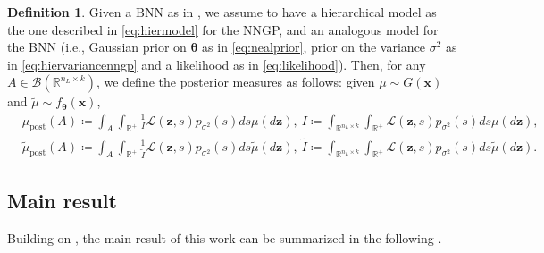 \documentclass[a4paper, 11pt, reqno]{amsart}
\theoremstyle{plain}
\theoremstyle{remark}
\theoremstyle{definition}
\newtheorem{definition}[theorem]{Definition}
\newcommand{\real}{\mathbb{R}}
\newcommand{\borel}[1]{\mathcal{B}\left(#1\right)}
\begin{document}
\begin{definition} \label{def:postnngpbnn}
    Given a BNN as in , we assume to have a hierarchical model as the one described in \cref{eq:hiermodel} for the NNGP, and an analogous model for the BNN (i.e., Gaussian prior on $\bm{\theta}$ as in \cref{eq:nealprior}, prior on the variance $\sigma^2$ as in \cref{eq:hiervariancenngp} and a likelihood as in \cref{eq:likelihood}). Then, for any $A \in \borel{\real^{n_L \times k}}$, we define the posterior measures as follows: given $\mu \sim G(\bm{x})$ and $\widetilde{\mu} \sim f_{\bm{\theta}}(\bm{x})$,
    \begin{equation*}
        \begin{aligned}
            & \mu_{\mathrm{post}}(A) \coloneqq \int_A \int_{\real^+} \frac{1}{\mathit{I}} \mathcal{L}(\bm{z}, s) p_{\sigma^2}(s) ds \mu(d\bm{z}), \ \mathit{I} \coloneqq \int_{\real^{n_L \times k}} \int_{\real^+} \mathcal{L}(\bm{z}, s) p_{\sigma^2}(s) ds \mu(d\bm{z}), \\
            & \widetilde{\mu}_{\mathrm{post}}(A) \coloneqq \int_A \int_{\real^+} \frac{1}{\widetilde{\mathit{I}}} \mathcal{L}(\bm{z}, s) p_{\sigma^2}(s) ds \widetilde{\mu}(d\bm{z}), \ \widetilde{\mathit{I}} \coloneqq \int_{\real^{n_L \times k}} \int_{\real^+} \mathcal{L}(\bm{z}, s) p_{\sigma^2}(s) ds \widetilde{\mu}(d\bm{z}).
        \end{aligned}
    \end{equation*}
\end{definition}

\subsection{Main result}

Building on , the main result of this work can be summarized in the following .
\end{document}
